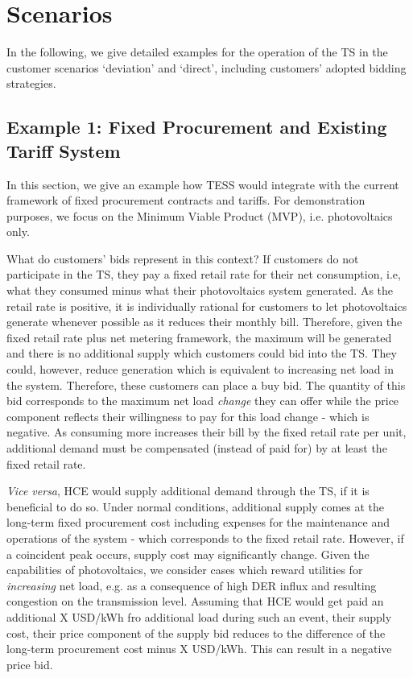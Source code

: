 \section{Scenarios}

In the following, we give detailed examples for the operation of the TS in the customer scenarios `deviation' and `direct', including customers' adopted bidding strategies.

\subsection{Example 1: Fixed Procurement and Existing Tariff System}

In this section, we give an example how TESS would integrate with the current framework of fixed procurement contracts and tariffs. For demonstration purposes, we focus on the Minimum Viable Product (MVP), i.e. photovoltaics only.

What do customers' bids represent in this context? If customers do not participate in the TS, they pay a fixed retail rate for their net consumption, i.e, what they consumed minus what their photovoltaics system generated. As the retail rate is positive, it is individually rational for customers to let photovoltaics generate whenever possible as it reduces their monthly bill. Therefore, given the fixed retail rate plus net metering framework, the maximum will be generated and there is no additional supply which customers could bid into the TS. They could, however, reduce generation which is equivalent to increasing net load in the system. Therefore, these customers can place a buy bid. The quantity of this bid corresponds to the maximum net load \textit{change} they can offer while the price component reflects their willingness to pay for this load change - which is negative. As consuming more increases their bill by the fixed retail rate per unit, additional demand must be compensated (instead of paid for) by at least the fixed retail rate.

\textit{Vice versa}, HCE would supply additional demand through the TS, if it is beneficial to do so. Under normal conditions, additional supply comes at the long-term fixed procurement cost including expenses for the maintenance and operations of the system - which corresponds to the fixed retail rate. However, if a coincident peak occurs, supply cost may significantly change. Given the capabilities of photovoltaics, we consider cases which reward utilities for \textit{increasing} net load, e.g. as a consequence of high DER influx and resulting congestion on the transmission level. Assuming that HCE would get paid an additional X USD/kWh fro additional load during such an event, their supply cost, their price component of the supply bid reduces to the difference of the long-term procurement cost minus X USD/kWh. This can result in a negative price bid.

